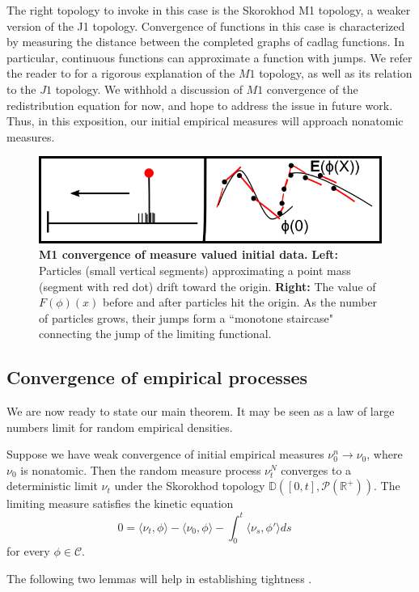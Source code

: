 The right topology to invoke in this case is the Skorokhod M1 topology, a weaker version of the J1 topology. Convergence of functions in this case is characterized by measuring the distance between the completed graphs of cadlag functions.  In particular, continuous functions can approximate a function with jumps.  We refer the reader to \cite{whitt2002stochastic} for a rigorous explanation of the $M1$ topology, as well as its relation to the $J1$ topology.   We withhold a discussion of $M1$ convergence of the redistribution equation for now, and hope to address the issue in future work.  Thus, in this exposition, our initial empirical measures will approach nonatomic measures.  
\begin{figure}
\begin{centering}
\includegraphics[width=.5\textwidth]{topcounter.png} 
\caption{\textbf{M1 convergence of measure valued initial data.}  \textbf{Left: }Particles (small vertical segments) approximating a point mass (segment with red dot) drift toward the origin. \textbf{Right:} The value of $F(\phi)(x)$ before and after particles hit the origin. As the number of particles grows, their jumps form a ``monotone staircase" connecting the jump of the limiting functional.}\label{topcounter}
\end{centering}
\end{figure}





\subsection{Convergence of empirical processes}

 We are now ready to state our main theorem.  It may be seen as a  law of large numbers limit for random empirical densities. 

\begin{theorem}\label{pdmpproof}
Suppose we have weak convergence of initial empirical measures $\nu_0^n \rightarrow \nu_0 $, where $\nu_0 $ is nonatomic.  Then the random measure process $\nu_t^N$ converges to a deterministic limit $\nu_t$ under the Skorokhod topology $\mathbb D([0,t], \mathcal P(\mathbb{R}^+))$. The limiting measure satisfies the kinetic equation
\begin{equation}\label{limeq1}
0= \langle \nu_t,\phi \rangle- \langle \nu_0,\phi \rangle- \int_0^t \langle \nu_s,\phi' \rangle ds \quad 
\end{equation}
for every $\phi \in \mathcal C$.

\end{theorem}
The following two lemmas will help in establishing tightness \cite{roelly1986criterion,joffe1986weak}.


